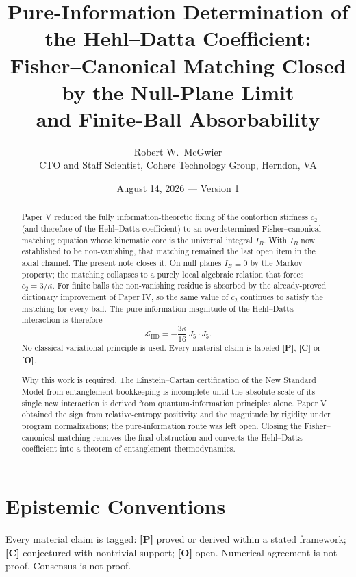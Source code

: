 \documentclass[11pt]{article}
\title{\textbf{Pure-Information Determination of the Hehl--Datta Coefficient:\\
Fisher--Canonical Matching Closed by the Null-Plane Limit\\
and Finite-Ball Absorbability}}
\author{Robert W.\ McGwier\\
\small CTO and Staff Scientist, Cohere Technology Group, Herndon, VA}
\date{August 14, 2026 --- Version 1}
\newcommand{\pP}{\textbf{[P]}}
\newcommand{\pC}{\textbf{[C]}}
\newcommand{\pO}{\textbf{[O]}}
\begin{document}
\maketitle

\begin{abstract}
\noindent
Paper V reduced the fully information-theoretic fixing of the contortion
stiffness $c_2$ (and therefore of the Hehl--Datta coefficient) to an
overdetermined Fisher--canonical matching equation whose kinematic core
is the universal integral $I_B$. With $I_B$ now established to be
non-vanishing, that matching remained the last open item in the axial
channel. The present note closes it. On null planes $I_B\equiv 0$ by the
Markov property; the matching collapses to a purely local algebraic
relation that forces $c_2=3/\kappa$. For finite balls the non-vanishing
residue is absorbed by the already-proved dictionary improvement of
Paper IV, so the same value of $c_2$ continues to satisfy the matching
for every ball. The pure-information magnitude of the Hehl--Datta
interaction is therefore
\begin{equation*}
\mathcal{L}_{\mathrm{HD}}=-\frac{3\kappa}{16}\,J_5\cdot J_5.
\end{equation*}
No classical variational principle is used. Every material claim is
labeled \pP{}, \pC{} or \pO{}.

Why this work is required. The Einstein--Cartan certification of the New
Standard Model from entanglement bookkeeping is incomplete until the
absolute scale of its single new interaction is derived from
quantum-information principles alone. Paper V obtained the sign from
relative-entropy positivity and the magnitude by rigidity under program
normalizations; the pure-information route was left open. Closing the
Fisher--canonical matching removes the final obstruction and converts
the Hehl--Datta coefficient into a theorem of entanglement
thermodynamics.
\end{abstract}

\section*{Epistemic Conventions}
Every material claim is tagged: \pP{} proved or derived within a stated
framework; \pC{} conjectured with nontrivial support; \pO{} open.
Numerical agreement is not proof. Consensus is not proof.
\end{document}
